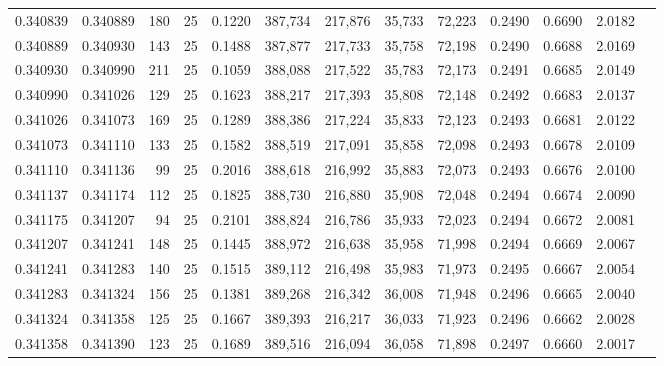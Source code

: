 \begin{tabular}{rrrrrrrrrrrrr}
0.340839 & 0.340889 &   180 &  25 &                                     0.1220 & 387,734 & 217,876 &  35,733 &  72,223 & 0.2490 & 0.6690 & 2.0182 \\
0.340889 & 0.340930 &   143 &  25 &                                     0.1488 & 387,877 & 217,733 &  35,758 &  72,198 & 0.2490 & 0.6688 & 2.0169 \\
0.340930 & 0.340990 &   211 &  25 &                                     0.1059 & 388,088 & 217,522 &  35,783 &  72,173 & 0.2491 & 0.6685 & 2.0149 \\
0.340990 & 0.341026 &   129 &  25 &                                     0.1623 & 388,217 & 217,393 &  35,808 &  72,148 & 0.2492 & 0.6683 & 2.0137 \\
0.341026 & 0.341073 &   169 &  25 &                                     0.1289 & 388,386 & 217,224 &  35,833 &  72,123 & 0.2493 & 0.6681 & 2.0122 \\
0.341073 & 0.341110 &   133 &  25 &                                     0.1582 & 388,519 & 217,091 &  35,858 &  72,098 & 0.2493 & 0.6678 & 2.0109 \\
0.341110 & 0.341136 &    99 &  25 &                                     0.2016 & 388,618 & 216,992 &  35,883 &  72,073 & 0.2493 & 0.6676 & 2.0100 \\
0.341137 & 0.341174 &   112 &  25 &                                     0.1825 & 388,730 & 216,880 &  35,908 &  72,048 & 0.2494 & 0.6674 & 2.0090 \\
0.341175 & 0.341207 &    94 &  25 &                                     0.2101 & 388,824 & 216,786 &  35,933 &  72,023 & 0.2494 & 0.6672 & 2.0081 \\
0.341207 & 0.341241 &   148 &  25 &                                     0.1445 & 388,972 & 216,638 &  35,958 &  71,998 & 0.2494 & 0.6669 & 2.0067 \\
0.341241 & 0.341283 &   140 &  25 &                                     0.1515 & 389,112 & 216,498 &  35,983 &  71,973 & 0.2495 & 0.6667 & 2.0054 \\
0.341283 & 0.341324 &   156 &  25 &                                     0.1381 & 389,268 & 216,342 &  36,008 &  71,948 & 0.2496 & 0.6665 & 2.0040 \\
0.341324 & 0.341358 &   125 &  25 &                                     0.1667 & 389,393 & 216,217 &  36,033 &  71,923 & 0.2496 & 0.6662 & 2.0028 \\
0.341358 & 0.341390 &   123 &  25 &                                     0.1689 & 389,516 & 216,094 &  36,058 &  71,898 & 0.2497 & 0.6660 & 2.0017 \\

\end{tabular}
